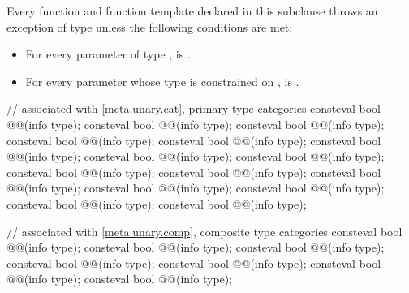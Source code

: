 \pnum
Every function and function template declared in this subclause
throws an exception of type 
unless the following conditions are met:
\begin{itemize}
\item
  For every parameter  of type ,
   is .
\item
  For every parameter 
  whose type is constrained on ,
   is .
\end{itemize}

\begin{codeblock}
// associated with \ref{meta.unary.cat}, primary type categories
consteval bool @@(info type);
consteval bool @@(info type);
consteval bool @@(info type);
consteval bool @@(info type);
consteval bool @@(info type);
consteval bool @@(info type);
consteval bool @@(info type);
consteval bool @@(info type);
consteval bool @@(info type);
consteval bool @@(info type);
consteval bool @@(info type);
consteval bool @@(info type);
consteval bool @@(info type);
consteval bool @@(info type);
consteval bool @@(info type);

// associated with \ref{meta.unary.comp}, composite type categories
consteval bool @@(info type);
consteval bool @@(info type);
consteval bool @@(info type);
consteval bool @@(info type);
consteval bool @@(info type);
consteval bool @@(info type);
consteval bool @@(info type);


\end{codeblock}
